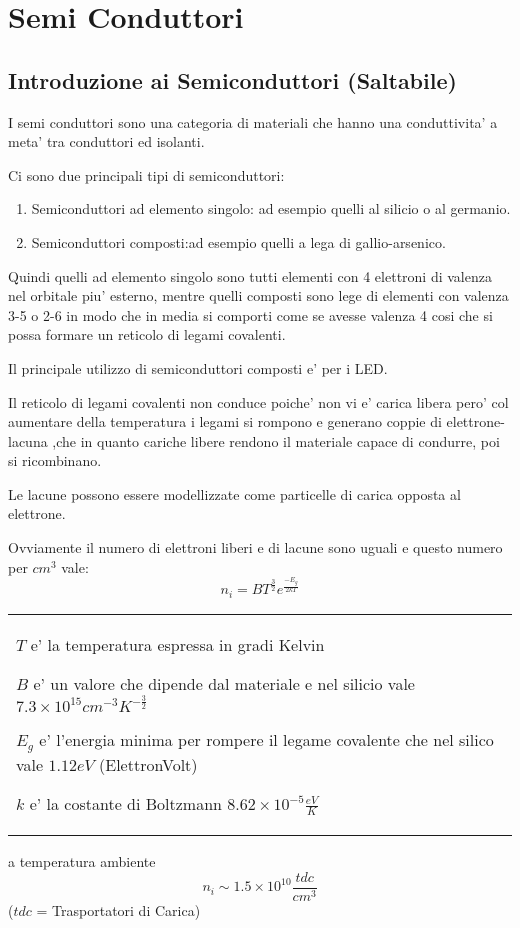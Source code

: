 \documentclass[\main/main.tex]{subfiles}
\begin{document}
\section{Semi Conduttori}
\subsection{Introduzione ai Semiconduttori (Saltabile)}
I semi conduttori sono una categoria di materiali che hanno una conduttivita' a meta' tra conduttori ed isolanti.

Ci sono due principali tipi di semiconduttori:
\begin{enumerate}  
	\item Semiconduttori ad elemento singolo: ad esempio quelli al silicio o al germanio.
	\item Semiconduttori composti:ad esempio quelli a lega di gallio-arsenico.
\end{enumerate}
Quindi quelli ad elemento singolo sono tutti elementi con 4 elettroni di valenza nel orbitale piu' esterno, mentre quelli composti sono lege di elementi con valenza 3-5 o 2-6 in modo che in media si comporti come se avesse valenza 4 cosi che si possa formare un reticolo di legami covalenti.

Il principale utilizzo di semiconduttori composti e' per i LED.

Il reticolo di legami covalenti non conduce poiche' non vi e' carica libera pero' col aumentare della temperatura i legami si rompono e generano coppie di elettrone-lacuna ,che in quanto cariche libere rendono il materiale capace di condurre, poi si ricombinano.

Le lacune possono essere modellizzate come particelle di carica opposta al elettrone.

Ovviamente il numero di elettroni liberi e di lacune sono uguali e questo numero per $cm^3$ vale:
\[n_i = BT^{\frac{3}{2}}e^{\frac{-E_g}{2kT}}\]
\begin{tabular}{l}
	$T$ e' la temperatura espressa in gradi Kelvin
	
	$B$ e' un valore che dipende dal materiale e nel silicio vale $7.3 \times 10^{15} cm^{-3} K^{-\frac{3}{2}}$
	
	$E_g$ e' l'energia minima per rompere il legame covalente che nel silico vale $1.12 eV$ (ElettronVolt)
	
	$k$ e' la costante di Boltzmann $8.62 \times 10^{-5} \frac{eV}{K}$
\end{tabular}
a temperatura ambiente \[n_i \sim 1.5 \times 10^{10} \frac{tdc}{cm^3}\]
($tdc$ = Trasportatori di Carica)
\clearpage
\end{document}
